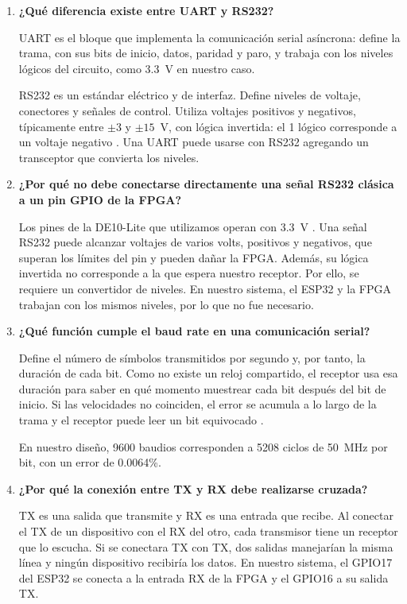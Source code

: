 \documentclass[11pt,letterpaper]{article}
\begin{document}
\begin{enumerate}
  \item \textbf{¿Qué diferencia existe entre UART y RS232?}

  UART es el bloque que implementa la comunicación serial asíncrona: define la
  trama, con sus bits de inicio, datos, paridad y paro, y trabaja con los
  niveles lógicos del circuito, como 3.3~V en nuestro caso.

  RS232 es un estándar eléctrico y de interfaz. Define niveles de voltaje,
  conectores y señales de control. Utiliza voltajes positivos y negativos,
  típicamente entre $\pm3$ y $\pm15$~V, con lógica invertida: el 1 lógico
  corresponde a un voltaje negativo \cite{ti232}. Una UART puede usarse con
  RS232 agregando un transceptor que convierta los niveles.

  \item \textbf{¿Por qué no debe conectarse directamente una señal RS232
  clásica a un pin GPIO de la FPGA?}

  Los pines de la DE10-Lite que utilizamos operan con 3.3~V \cite{de10}. Una
  señal RS232 puede alcanzar voltajes de varios volts, positivos y negativos,
  que superan los límites del pin y pueden dañar la FPGA. Además, su lógica
  invertida no corresponde a la que espera nuestro receptor. Por ello, se
  requiere un convertidor de niveles. En nuestro sistema, el ESP32 y la FPGA
  trabajan con los mismos niveles, por lo que no fue necesario.

  \item \textbf{¿Qué función cumple el baud rate en una comunicación serial?}

  Define el número de símbolos transmitidos por segundo y, por tanto, la
  duración de cada bit. Como no existe un reloj compartido, el receptor usa
  esa duración para saber en qué momento muestrear cada bit después del bit
  de inicio. Si las velocidades no coinciden, el error se acumula a lo largo
  de la trama y el receptor puede leer un bit equivocado \cite{brown}.

  En nuestro diseño, 9600 baudios corresponden a 5208 ciclos de 50~MHz por
  bit, con un error de 0.0064\%.

  \item \textbf{¿Por qué la conexión entre TX y RX debe realizarse cruzada?}

  TX es una salida que transmite y RX es una entrada que recibe. Al conectar
  el TX de un dispositivo con el RX del otro, cada transmisor tiene un
  receptor que lo escucha. Si se conectara TX con TX, dos salidas manejarían
  la misma línea y ningún dispositivo recibiría los datos. En nuestro sistema,
  el GPIO17 del ESP32 se conecta a la entrada RX de la FPGA y el GPIO16 a su
  salida TX.


\end{enumerate}
\end{document}
